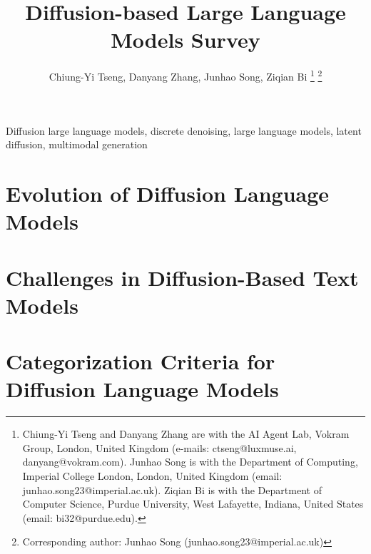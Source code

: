 \documentclass[lettersize,journal]{IEEEtran}
\begin{document}
\title{Diffusion-based Large Language Models Survey}

\author{Chiung-Yi Tseng, Danyang Zhang, Junhao Song, Ziqian Bi%
\thanks{Chiung-Yi Tseng and Danyang Zhang are with the AI Agent Lab, Vokram Group, London, United Kingdom (e-mails: ctseng@luxmuse.ai, danyang@vokram.com). Junhao Song is with the Department of Computing, Imperial College London, London, United Kingdom (email: junhao.song23@imperial.ac.uk). Ziqian Bi is with the Department of Computer Science, Purdue University, West Lafayette, Indiana, United States (email: bi32@purdue.edu).}%
\thanks{Corresponding author: Junhao Song (junhao.song23@imperial.ac.uk)}
}


\maketitle

\begin{abstract}

\end{abstract}

\begin{IEEEkeywords}
Diffusion large language models, discrete denoising, large language models, latent diffusion, multimodal generation
\end{IEEEkeywords}

\section{Evolution of Diffusion Language Models}
\label{sec:evolution}


\section{Challenges in Diffusion-Based Text Models}
\label{sec:challenges}



\section{Categorization Criteria for Diffusion Language Models}
\label{sec:categorization_methods}


\end{document}

